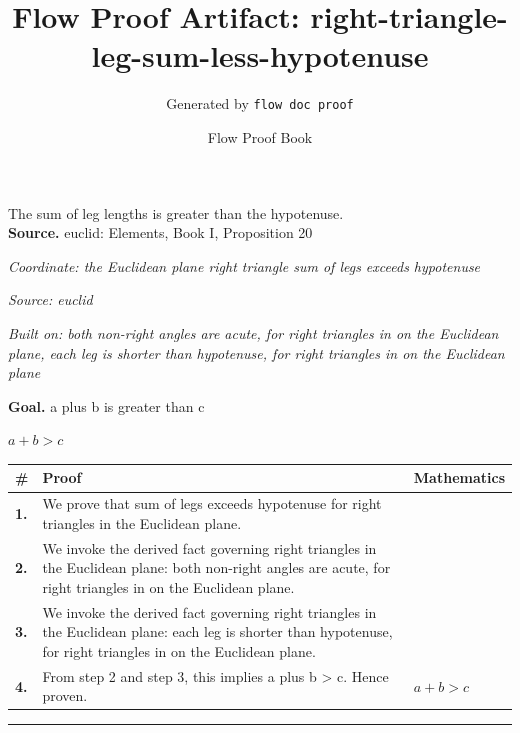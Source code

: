 \documentclass[11pt]{article}
\title{Flow Proof Artifact: right-triangle-leg-sum-less-hypotenuse}
\author{Generated by \texttt{flow doc proof}}
\date{Flow Proof Book}
\theoremstyle{definition}
\begin{document}
\maketitle
The sum of leg lengths is greater than the hypotenuse.\\[0.5em]
\textbf{Source.} euclid: Elements, Book I, Proposition 20\\[0.5em]
\bigskip
{}\par
\smallskip\noindent\textit{Coordinate: the Euclidean plane \cdot right triangle \cdot sum of legs exceeds hypotenuse}\par
\smallskip\noindent\textit{Source: euclid}\par
\smallskip\noindent\textit{Built on: both non-right angles are acute, for right triangles in on the Euclidean plane, each leg is shorter than hypotenuse, for right triangles in on the Euclidean plane}\par
\medskip
\noindent\textbf{Goal.} a plus b is greater than c\par
\noindent$\displaystyle a + b > c$\par
\medskip
\noindent
\begin{tabular}{@{} >{\raggedright\arraybackslash}p{} >{\raggedright\arraybackslash}p{} >{\raggedleft\arraybackslash}p{} @{}}
\textbf{\#} & \textbf{Proof} & \textbf{Mathematics} \\
\midrule
\textbf{1.} & We prove that sum of legs exceeds hypotenuse for right triangles in the Euclidean plane. & \\[0.45em]
\textbf{2.} & We invoke the derived fact governing right triangles in the Euclidean plane: both non-right angles are acute, for right triangles in on the Euclidean plane. & \\[0.45em]
\textbf{3.} & We invoke the derived fact governing right triangles in the Euclidean plane: each leg is shorter than hypotenuse, for right triangles in on the Euclidean plane. & \\[0.45em]
\textbf{4.} & From step 2 and step 3, this implies a plus b > c. Hence proven. & $\displaystyle a + b > c$ \\[0.45em]
\bottomrule
\end{tabular}
\label{thm:Geometry-right triangle-sum_of_legs_exceeds_hypotenuse}
\par\medskip\hrule
\end{document}
